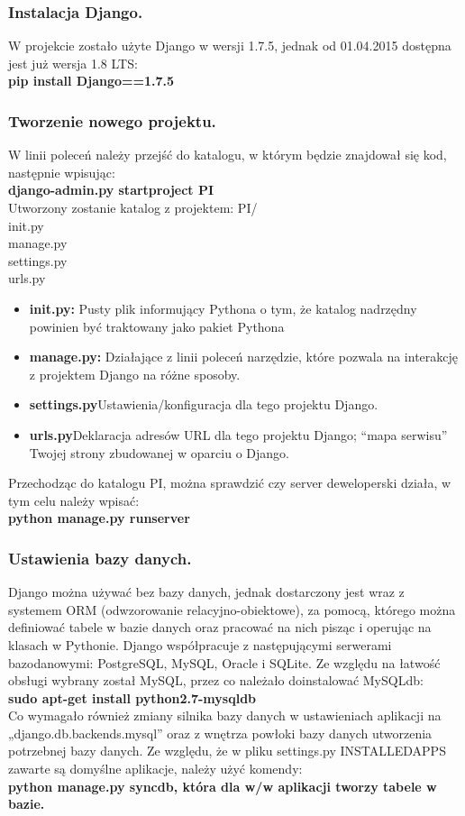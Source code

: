 \documentclass[a4paper,12pt]{article}		%
\begin{document}
\subsubsection{Instalacja Django.}
W projekcie zostało użyte Django w wersji 1.7.5, jednak od 01.04.2015 dostępna jest już wersja 1.8 LTS:\\
\textbf{pip install Django==1.7.5}
\subsubsection{Tworzenie nowego projektu.}
W linii poleceń należy przejść do katalogu, w którym będzie znajdował się kod, następnie wpisując:\\
\textbf{django-admin.py startproject PI}\\
Utworzony zostanie katalog z projektem:
PI/\\
init.py\\
manage.py\\
settings.py\\
urls.py
\begin{itemize}
\item \textbf{init.py: }Pusty plik informujący Pythona o tym, że katalog nadrzędny powinien być traktowany jako pakiet Pythona 
\item \textbf{manage.py: }Działające z linii poleceń narzędzie, które pozwala na interakcję z projektem Django na różne sposoby.
\item \textbf{settings.py}Ustawienia/konfiguracja dla tego projektu Django.
\item \textbf{urls.py}Deklaracja adresów URL dla tego projektu Django; “mapa serwisu” Twojej strony zbudowanej w oparciu o Django.
\end{itemize}
Przechodząc do katalogu PI, można sprawdzić czy server deweloperski działa, w tym celu należy wpisać:\\
\textbf{python manage.py runserver}
\subsubsection{Ustawienia bazy danych.}
Django można używać bez bazy danych, jednak dostarczony jest wraz z systemem ORM (odwzorowanie relacyjno-obiektowe), za pomocą, którego można definiować tabele w bazie danych oraz pracować na nich pisząc i operując na klasach w Pythonie. Django współpracuje z następującymi serwerami bazodanowymi: PostgreSQL, MySQL, Oracle i SQLite. Ze względu na łatwość obsługi wybrany został MySQL, przez co należało doinstalować MySQLdb:\\
\textbf{sudo apt-get install python2.7-mysqldb}\\
Co wymagało również zmiany silnika bazy danych w ustawieniach aplikacji na „django.db.backends.mysql” oraz z wnętrza powłoki bazy danych utworzenia 
potrzebnej bazy danych. Ze względu, że w pliku settings.py INSTALLEDAPPS zawarte są domyślne aplikacje, należy użyć komendy:\\
\textbf{python manage.py syncdb, która dla w/w aplikacji tworzy tabele w bazie.}
\end{document}
